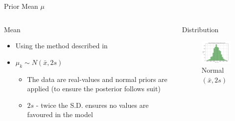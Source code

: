 \documentclass[t, aspectratio=169]{beamer}
\begin{document}
\begin{frame}[label={sec:org85e0d5f}]{Prior Mean \(\mu\)}
\begin{columns}
\begin{column}{0.6\columnwidth}
\begin{block}{Mean}
\begin{itemize}
\item Using the method described in \citep{Kruschke2012}
\item \(\mu_k \sim N(\bar{x},2s)\)
\begin{itemize}
\item The data are real-values and normal priors are applied (to ensure the posterior follows suit)
\item \(2s\) - twice the S.D. ensures no values are favoured in the model
\end{itemize}
\end{itemize}
\end{block}
\end{column}

\begin{column}{0.4\columnwidth}
\begin{block}{Distribution}
\begin{figure}[htbp]
\centering
\includegraphics[width=4.5cm]{./images/mu.png}
\caption{\label{fig:org14e0d21}
Normal\((\bar{x},2s)\)}
\end{figure}
\end{block}
\end{column}
\end{columns}
\end{frame}
\end{document}
